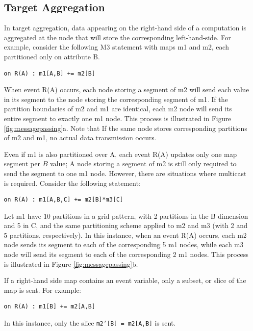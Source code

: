 \documentclass{vldb}
\begin{document}
\subsection{Target Aggregation}
In target aggregation, data appearing on the right-hand side of a computation is aggregated at the node that will store the corresponding left-hand-side.  For example, consider the following M3 statement with maps m1 and m2, each partitioned only on attribute B.
\begin{verbatim}
on R(A) : m1[A,B] += m2[B]
\end{verbatim}
When event R(A) occurs, each node storing a segment of m2 will send each value in its segment to the node storing the corresponding segment of m1.  If the partition boundaries of m2 and m1 are identical, each m2 node will send its entire segment to exactly one m1 node.  This process is illustrated in Figure \ref{fig:messagepassing}a.  Note that If the same node stores corresponding partitions of m2 and m1, no actual data transmission occurs.  

Even if m1 is also partitioned over A, each event R(A) updates only one map segment per $B$ value; A node storing a segment of m2 is still only required to send the segment to one m1 node.  However, there are situations where multicast is required.  Consider the following statement:
\begin{verbatim}
on R(A) : m1[A,B,C] += m2[B]*m3[C]
\end{verbatim}
Let m1 have 10 partitions in a grid pattern, with 2 partitions in the B dimension and 5 in C, and the same partitioning scheme applied to m2 and m3 (with 2 and 5 partitions, respectively).  In this instance, when an event R(A) occurs, each m2 node sends its segment to each of the corresponding 5 m1 nodes, while each m3 node will send its segment to each of the corresponding 2 m1 nodes.  This process is illustrated in Figure \ref{fig:messagepassing}b. 

If a right-hand side map contains an event variable, only a subset, or slice of the map is sent.  For example:
\begin{verbatim}
on R(A) : m1[B] += m2[A,B]
\end{verbatim}
In this instance, only the slice \texttt{m2'[B] = m2[A,B]} is sent.
\end{document}
